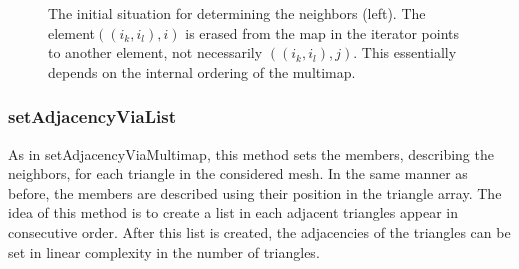 \documentclass[10pt]{article}
\begin{document}
\begin{figure}[h]  
	\begin{minipage}{0.4\textwidth}
		
	\end{minipage}
	\hfill
	\begin{minipage}{0.4\textwidth}
		\vspace{1cm}
		
		
	\end{minipage}
	\caption{The initial situation for determining the neighbors (left). The element$ ((i_k,i_l),i) $ is erased from the map in the iterator points to another element, not necessarily $((i_k,i_l),j)$. This essentially depends on the internal ordering of the multimap.  }

\end{figure}


\subsubsection{setAdjacencyViaList} \label{list}
As in {\ttfamily setAdjacencyViaMultimap}, this method sets the members, describing the neighbors, for each triangle in the considered mesh. In the same manner as before, the members are described using their position in the triangle array. The idea of this method is to create a list in each adjacent triangles appear in consecutive order. After this list is created, the adjacencies of the triangles can be set in linear complexity in the number of triangles.
\end{document}
